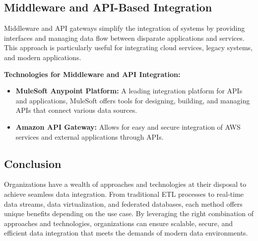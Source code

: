 \documentclass[12pt]{article}
\begin{document}
\subsection{Middleware and API-Based Integration}
Middleware and API gateways simplify the integration of systems by providing interfaces and managing data flow between disparate applications and services. This approach is particularly useful for integrating cloud services, legacy systems, and modern applications.

\textbf{Technologies for Middleware and API Integration:}
\begin{itemize}
    \item \textbf{MuleSoft Anypoint Platform:} A leading integration platform for APIs and applications, MuleSoft offers tools for designing, building, and managing APIs that connect various data sources.
    \item \textbf{Amazon API Gateway:} Allows for easy and secure integration of AWS services and external applications through APIs.
\end{itemize}

\subsection{Conclusion}
Organizations have a wealth of approaches and technologies at their disposal to achieve seamless data integration. From traditional ETL processes to real-time data streams, data virtualization, and federated databases, each method offers unique benefits depending on the use case. By leveraging the right combination of approaches and technologies, organizations can ensure scalable, secure, and efficient data integration that meets the demands of modern data environments.
\end{document}
